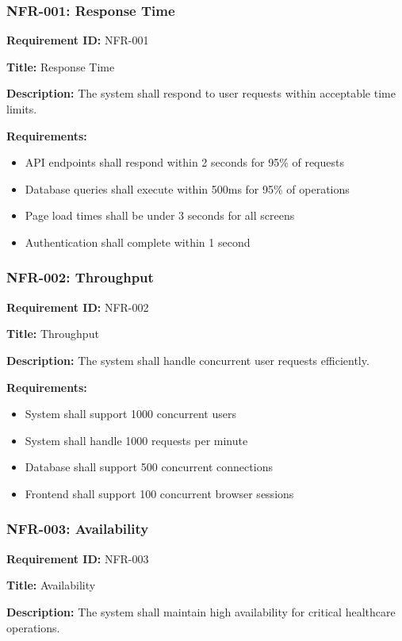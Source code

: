 \documentclass[12pt,a4paper]{article}
\begin{document}
\subsubsection{NFR-001: Response Time}

\textbf{Requirement ID:} NFR-001

\textbf{Title:} Response Time

\textbf{Description:} The system shall respond to user requests within acceptable time limits.

\textbf{Requirements:}
\begin{itemize}
    \item API endpoints shall respond within 2 seconds for 95\% of requests
    \item Database queries shall execute within 500ms for 95\% of operations
    \item Page load times shall be under 3 seconds for all screens
    \item Authentication shall complete within 1 second
\end{itemize}

\subsubsection{NFR-002: Throughput}

\textbf{Requirement ID:} NFR-002

\textbf{Title:} Throughput

\textbf{Description:} The system shall handle concurrent user requests efficiently.

\textbf{Requirements:}
\begin{itemize}
    \item System shall support 1000 concurrent users
    \item System shall handle 1000 requests per minute
    \item Database shall support 500 concurrent connections
    \item Frontend shall support 100 concurrent browser sessions
\end{itemize}

\subsubsection{NFR-003: Availability}

\textbf{Requirement ID:} NFR-003

\textbf{Title:} Availability

\textbf{Description:} The system shall maintain high availability for critical healthcare operations.
\end{document}
